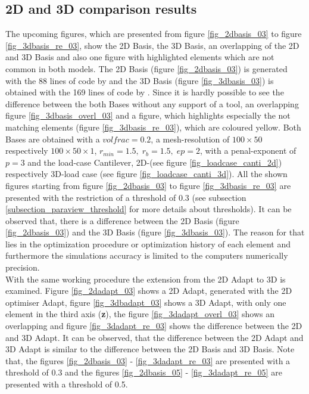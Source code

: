 \newpage
\subsection{2D and 3D comparison results}
The upcoming figures, which are presented from figure \ref{fig_2dbasis_03} to
 figure \ref{fig_3dbasis_re_03}, show the 2D Basis, the 3D Basis, an overlapping of
 the 2D and 3D Basis and also one figure with highlighted elements which
 are not common in both models.
 The 2D Basis (figure \ref{fig_2dbasis_03}) is generated with the 88
  lines of code by \cite{Andreassen.2011} and the 3D Basis (figure \ref{fig_3dbasis_03}) is
  obtained with the 169 lines of code by \cite{Liu.2014}. 
  Since it is hardly possible 
   to see the difference between the both Bases without any support of a tool, an
 overlapping figure \ref{fig_3dbasis_overl_03} and a figure, which highlights
 especially the not matching elements (figure \ref{fig_3dbasis_re_03}), which
 are coloured yellow.  
  Both Bases
  are obtained with a $volfrac = 0.2$, a mesh-resolution of $100 \times 50$
  respectively $100 \times 50 \times 1$, $r_{min} = 1.5,\; r_{b} = 1.5,\; ep = 2$, with a
   penal-exponent of $p = 3$ and the load-case Cantilever, 
   2D-(see figure
   \ref{fig_loadcase_canti_2d}) respectively 3D-load case (see figure
 \ref{fig_loadcase_canti_3d}).
  All the shown figures starting from figure \ref{fig_2dbasis_03} to figure \ref{fig_3dbasis_re_03}
  are presented with the restriction of a threshold of 0.3
 (see subsection \ref{subsection_paraview_threshold} for more details about thresholds).
It can be observed that, there is a difference between the 2D Basis
(figure \ref{fig_2dbasis_03}) and the 3D Basis (figure \ref{fig_3dbasis_03}).
The reason for that lies in the
optimization procedure or optimization history of each element
and furthermore the simulations accuracy is limited to the computers numerically precision. \\

With the same working procedure the extension from the 2D Adapt to 3D is examined. Figure \ref{fig_2dadapt_03} shows a 2D Adapt, generated with the 2D optimiser Adapt, figure \ref{fig_3dbadapt_03} shows a 3D Adapt,
with only
 one element in the third axis (\textbf{z}), the figure \ref{fig_3dadapt_overl_03}
 shows an overlapping and figure \ref{fig_3dadapt_re_03} shows the difference
  between the 2D and 3D Adapt. It can be observed, that the difference
  between the 2D Adapt and 3D Adapt is similar to the difference between the 2D Basis and 3D Basis.
  Note that, the figures \ref{fig_2dbasis_03} - 
  \ref{fig_3dadapt_re_03} are presented with a threshold of 0.3 and the figures \ref{fig_2dbasis_05} - \ref{fig_3dadapt_re_05} are
presented 
 with a threshold of 0.5.\\

